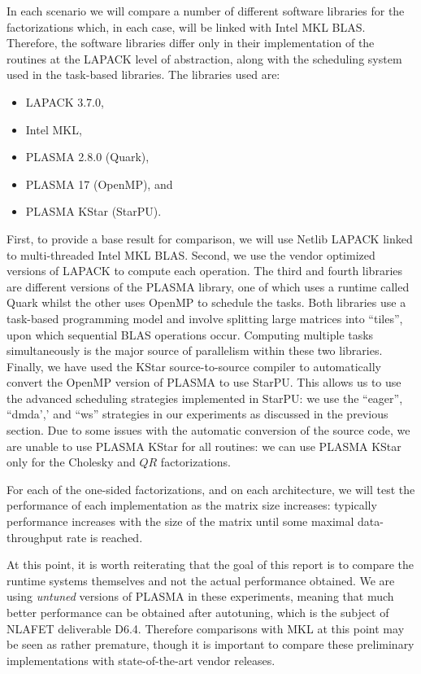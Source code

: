 \documentclass[a4paper,12pt]{article}
\begin{document}
In each scenario we will compare a number of different software libraries
for the factorizations which,
in each case,
will be linked with Intel MKL BLAS.
Therefore, the software libraries differ only in their
implementation of the routines at the LAPACK level of abstraction,
along with the scheduling system used in the task-based libraries.
The libraries used are:
\begin{itemize}
\item LAPACK 3.7.0,
\item Intel MKL,
\item PLASMA 2.8.0 (Quark),
\item PLASMA 17 (OpenMP), and
\item PLASMA KStar (StarPU).
\end{itemize}

First,
to provide a base result for comparison,
we will use Netlib LAPACK linked to multi-threaded Intel MKL BLAS.
Second,
we use the vendor optimized versions of LAPACK to compute each operation.
The third and fourth libraries are different versions of the PLASMA
library,
one of which uses a runtime called Quark whilst the other uses OpenMP
to schedule the tasks.
Both libraries use a task-based programming model and involve
splitting large matrices into ``tiles'',
upon which sequential BLAS operations occur.
Computing multiple tasks simultaneously is the major source of parallelism
within these two libraries.
Finally,
we have used the KStar source-to-source compiler to automatically
convert the OpenMP version of PLASMA to use StarPU.
This allows us to use the advanced scheduling strategies implemented
in StarPU:
we use the ``eager'', ``dmda',' and ``ws'' strategies in our
experiments as discussed in the previous section.
Due to some issues with the automatic conversion of the source code,
we are unable to use PLASMA KStar for all routines:
we can use PLASMA KStar only for the Cholesky and $QR$ factorizations.

For each of the one-sided factorizations,
and on each architecture,
we will test the performance of each implementation
as the matrix size increases:
typically performance increases with the size of the matrix until
some maximal data-throughput rate is reached.

At this point,
it is worth reiterating that the goal of this report is to
compare the runtime systems themselves
and not the actual performance obtained.
We are using \emph{untuned} versions of PLASMA in these experiments,
meaning that much better performance can be obtained
after autotuning,
which is the subject of NLAFET deliverable D6.4.
Therefore comparisons with MKL at this point
may be seen as rather premature,
though it is important to compare these preliminary implementations
with state-of-the-art vendor releases.
\end{document}
